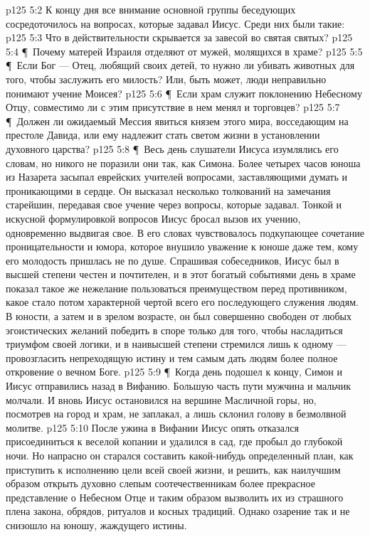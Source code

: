 \vs p125 5:2 К концу дня все внимание основной группы беседующих сосредоточилось на вопросах, которые задавал Иисус. Среди них были такие:
\vs p125 5:3 \bibnobreakspace Что в действительности скрывается за завесой во святая святых?
\vs p125 5:4 \P\ \bibnobreakspace Почему матерей Израиля отделяют от мужей, молящихся в храме?
\vs p125 5:5 \P\ \bibnobreakspace Если Бог --- Отец, любящий своих детей, то нужно ли убивать животных для того, чтобы заслужить его милость? Или, быть может, люди неправильно понимают учение Моисея?
\vs p125 5:6 \P\ \bibnobreakspace Если храм служит поклонению Небесному Отцу, совместимо ли с этим присутствие в нем менял и торговцев?
\vs p125 5:7 \P\ \bibnobreakspace Должен ли ожидаемый Мессия явиться князем этого мира, восседающим на престоле Давида, или ему надлежит стать светом жизни в установлении духовного царства?
\vs p125 5:8 \P\ Весь день слушатели Иисуса изумлялись его словам, но никого не поразили они так, как Симона. Более четырех часов юноша из Назарета засыпал еврейских учителей вопросами, заставляющими думать и проникающими в сердце. Он высказал несколько толкований на замечания старейшин, передавая свое учение через вопросы, которые задавал. Тонкой и искусной формулировкой вопросов Иисус бросал вызов их учению, одновременно выдвигая свое. В его словах чувствовалось подкупающее сочетание проницательности и юмора, которое внушило уважение к юноше даже тем, кому его молодость пришлась не по душе. Спрашивая собеседников, Иисус был в высшей степени честен и почтителен, и в этот богатый событиями день в храме показал такое же нежелание пользоваться преимуществом перед противником, какое стало потом характерной чертой всего его последующего служения людям. В юности, а затем и в зрелом возрасте, он был совершенно свободен от любых эгоистических желаний победить в споре только для того, чтобы насладиться триумфом своей логики, и в наивысшей степени стремился лишь к одному --- провозгласить непреходящую истину и тем самым дать людям более полное откровение о вечном Боге.
\vs p125 5:9 \P\ Когда день подошел к концу, Симон и Иисус отправились назад в Вифанию. Большую часть пути мужчина и мальчик молчали. И вновь Иисус остановился на вершине Масличной горы, но, посмотрев на город и храм, не заплакал, а лишь склонил голову в безмолвной молитве.
\vs p125 5:10 После ужина в Вифании Иисус опять отказался присоединиться к веселой копании и удалился в сад, где пробыл до глубокой ночи. Но напрасно он старался составить какой\hyp{}нибудь определенный план, как приступить к исполнению цели всей своей жизни, и решить, как наилучшим образом открыть духовно слепым соотечественникам более прекрасное представление о Небесном Отце и таким образом вызволить их из страшного плена закона, обрядов, ритуалов и косных традиций. Однако озарение так и не снизошло на юношу, жаждущего истины.
